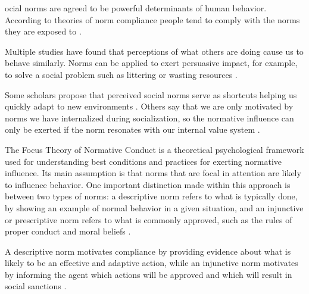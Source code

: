 \documentclass[preprint,12pt]{elsarticle}
\begin{document}
ocial norms are agreed to be powerful determinants of human behavior. 
According to theories of norm compliance people tend to comply with the norms they are exposed to \citep{morris2018common, cialdini1990focus}. 

Multiple studies have found that perceptions of what others are doing cause us to behave similarly. Norms can be applied to exert persuasive impact, for example, to solve a social problem such as littering or wasting resources \citep{cialdini2006managing, cialdini1990focus, goldstein2008room}. 



Some scholars propose that perceived social norms serve as shortcuts helping us quickly adapt to new environments \citep{cialdini1990focus}. Others say that we are only motivated by norms we have internalized during socialization, so the normative influence can only be exerted if the norm resonates with our internal value system \citep{morris2018common}.  %

The Focus Theory of Normative Conduct \citep{kallgren2000focus} is a  theoretical psychological  framework used for understanding best conditions and practices for exerting normative influence. Its main assumption is that norms that are focal in attention are likely to influence behavior. One important distinction made within this approach is between two types of norms: a descriptive norm refers to what is typically done, by showing an example of normal behavior in a given situation, and an injunctive or prescriptive norm refers to what is commonly approved, such as the rules of proper conduct and moral beliefs \citep{cialdini1990focus}. 

A descriptive norm motivates compliance by providing evidence about what is likely to be an effective and adaptive action, while an injunctive norm motivates by informing the agent which actions will be approved and which will result in social sanctions \citep{yanowitzky2006communication, cialdini2004social, kallgren2000focus}. 

\end{document}
